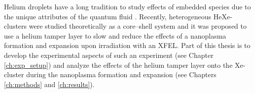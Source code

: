 %
Helium droplets have a long tradition to study effects of embedded species due to the unique attributes of the quantum fluid \citep{VonHaeften-1997-PRL,VonPietrowski-2006-EPJ,Stienkemeier-2006-JPhysB,Buchta-2013-JCPA,Gomez-2014-Science}. Recently, heterogeneous HeXe-clusters were studied theoretically as a core--shell system \citep{Mikaberidze-2008-PRA} and it was proposed to use a helium tamper layer to slow and reduce the effects of a nanoplasma formation and expansion upon irradiation with an XFEL. Part of this thesis is to develop the experimental aspects of such an experiment (see Chapter \ref{ch:exp_setup}) and analyze the effects of the helium tamper layer onto the Xe-cluster during the nanoplasma formation and expansion (see Chapters \ref{ch:methods} and \ref{ch:results}).\\[1\baselineskip]
%
%
%
%
%